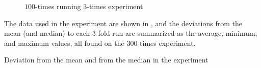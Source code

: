\begin{figure}
  \centering
  
  \begin{minipage}[t]{\linewidth}
  \end{minipage}
  \caption{$100$-times running $3$-times experiment}
  \label{fig:CProbust}
\end{figure}

The data used in the experiment are shown in , and the deviations from the mean (and median) to each $3$-fold run are summarized as the average, minimum, and maximum values, all found on the $300$-times experiment.

\begin{table}
  \centering
  \begin{tiny}
  
  \end{tiny}
  \caption{Deviation from the mean and from the median in the experiment}
  \label{tab:simStats}
\end{table}

